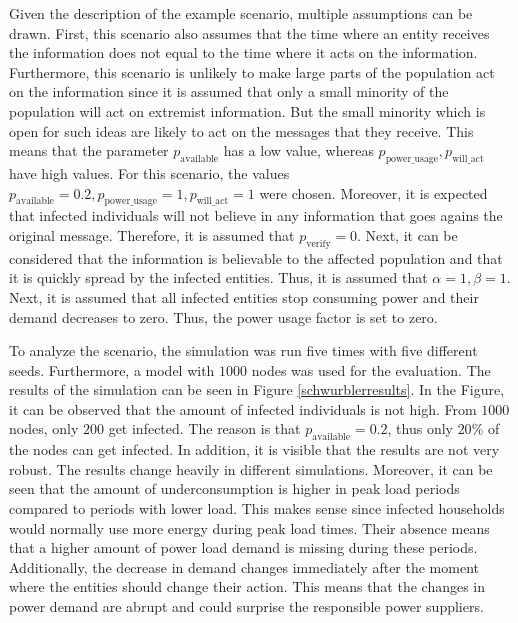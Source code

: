 Given the description of the example scenario, multiple assumptions can be drawn.
First, this scenario also assumes that the time where an entity receives the
information does not equal to the time where it acts on the information.
Furthermore, this scenario is unlikely to make large parts of the population
act on the information since it is assumed that only a small minority
of the population will act on extremist information. But the small 
minority which is open for such ideas are likely to act on the 
messages that they receive.
This means that the parameter $p_{\mathrm{available}}$ has a low value,
whereas $p_{\mathrm{power\_usage}}, p_{\mathrm{will\_act}}$
have high values. For this scenario, the values 
$p_{\mathrm{available}}=0.2, 
p_{\mathrm{power\_usage}}=1, p_{\mathrm{will\_act}}=1$
were chosen.
Moreover, it is expected that infected individuals will not 
believe in any information that goes agains the original message.
Therefore, it is assumed that $p_{\mathrm{verify}}=0$. Next, it
can be considered that the information is believable to 
the affected population and that it is quickly spread by 
the infected entities. Thus, it is assumed that $\alpha=1, \beta=1$.
Next, it is assumed that all infected entities 
stop consuming power and their demand decreases to zero. Thus,
the power usage factor  is set to zero.

To analyze the scenario, the simulation was run five times with five 
different seeds. Furthermore, a model with $1000$ nodes was used 
for the evaluation. The results of the simulation can be seen in
Figure \ref{schwurblerresults}. In the Figure, it can be 
observed that the amount of infected individuals is not high.
From $1000$ nodes, only $200$ get infected. The reason is 
that $p_{\mathrm{available}}=0.2$, thus only $20\%$ of the nodes
can get infected. In addition, it is visible that the results 
are not very robust. The results change heavily in different 
simulations.
Moreover, it can be seen that the amount of underconsumption
is higher in peak load periods compared to periods with 
lower load. This makes sense since infected households would 
normally use more energy during peak load times. Their absence
means that a higher amount of power load demand is missing 
during these periods. Additionally, the decrease in demand 
changes immediately after the moment where the entities 
should change their action. This means that the changes 
in power demand are abrupt and could surprise the responsible 
power suppliers.

